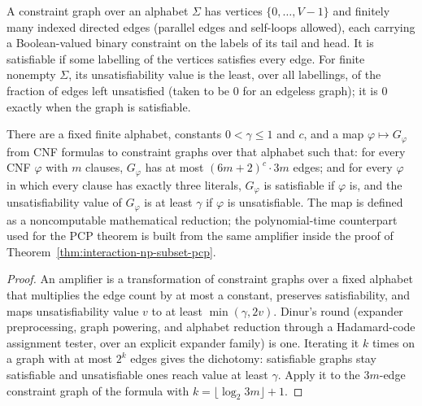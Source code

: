 \begin{definition}
  \label{def:interaction-constraint-graph}
  \leanok
  A constraint graph over an alphabet $\Sigma$ has vertices
  $\{0, \dots, V - 1\}$ and finitely many indexed directed edges (parallel
  edges and self-loops allowed), each carrying a Boolean-valued binary
  constraint on the labels of its tail and head. It is satisfiable if some
  labelling of the vertices satisfies every edge. For finite nonempty
  $\Sigma$, its unsatisfiability value is the least, over all labellings, of
  the fraction of edges left unsatisfied (taken to be $0$ for an edgeless
  graph); it is $0$ exactly when the graph is satisfiable.
\end{definition}

\begin{theorem}
  \label{thm:interaction-dinur-gap}
  \leanok
  There are a fixed finite alphabet, constants $0 < \gamma \le 1$ and $c$,
  and a map $\varphi \mapsto G_\varphi$ from CNF formulas to constraint graphs
  over that alphabet such that: for every CNF $\varphi$ with $m$ clauses,
  $G_\varphi$ has at most $(6m + 2)^{c} \cdot 3m$ edges; and for every
  $\varphi$ in which every clause has exactly three literals, $G_\varphi$ is
  satisfiable if $\varphi$ is, and the unsatisfiability value of $G_\varphi$
  is at least $\gamma$ if $\varphi$ is unsatisfiable. The map is defined as a
  noncomputable mathematical reduction; the polynomial-time counterpart used
  for the PCP theorem is built from the same amplifier inside the proof of
  Theorem~\ref{thm:interaction-np-subset-pcp}.
\end{theorem}
\begin{proof}
  \leanok
  An amplifier is a transformation of constraint graphs over a fixed alphabet
  that multiplies the edge count by at most a constant, preserves
  satisfiability, and maps unsatisfiability value $v$ to at least
  $\min(\gamma, 2v)$. Dinur's round (expander preprocessing, graph powering,
  and alphabet reduction through a Hadamard-code assignment tester, over an
  explicit expander family) is one. Iterating it $k$ times on a graph with at
  most $2^k$ edges gives the dichotomy: satisfiable graphs stay satisfiable
  and unsatisfiable ones reach value at least $\gamma$. Apply it to the
  $3m$-edge constraint graph of the formula with
  $k = \lfloor \log_2 3m \rfloor + 1$.
\end{proof}

